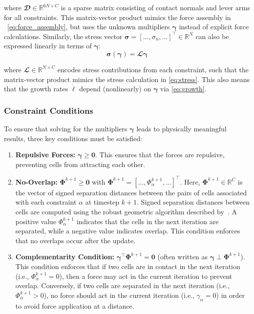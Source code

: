 \documentclass[conference]{IEEEtran}
\begin{document}
where $\mathbfcal{D} \in \mathbb{R}^{6N \times C}$ is a sparse matrix consisting of contact normals and lever arms for all constraints. This matrix-vector product mimics the force assembly in ~\autoref{eq:force_assembly}, but uses the unknown multipliers $\boldsymbol{\gamma}$ instead of explicit force calculations. Similarly, the stress vector $\boldsymbol{\sigma} = [\dots, \sigma_n, \dots]^\top \in \mathbb{R}^{N}$ can also be expressed linearly in terms of $\boldsymbol{\gamma}$:
\begin{equation} \label{eq:stress_as_function_of_multipliers}
    \boldsymbol{\sigma}(\boldsymbol{\gamma}) = \mathbfcal{L} \boldsymbol{\gamma}
\end{equation}

where $\mathbfcal{L} \in \mathbb{R}^{N \times C}$ encodes stress contributions from each constraint, such that the matrix-vector product mimics the stress calculation in \autoref{eq:stress}. This also means that the growth rates $\dot{\boldsymbol{\ell}}$ depend (nonlinearly) on $\boldsymbol{\gamma}$ via \autoref{eq:growth}.

\subsubsection{Constraint Conditions}

To ensure that solving for the multipliers $\boldsymbol{\gamma}$ leads to physically meaningful results, three key conditions must be satisfied:


\begin{enumerate}
    \item \textbf{Repulsive Forces:} $\boldsymbol{\gamma} \geq \mathbf{0}$. This ensures that the forces are repulsive, preventing cells from attracting each other.
    \item \textbf{No-Overlap:} $\mathbf{\Phi}^{k+1} \geq \mathbf{0}$ with $\mathbf{\Phi}^{k+1} = [\dots, \Phi_\alpha^{k+1}, \dots]^\top$. Here, $\mathbf{\Phi}^{k+1} \in \mathbb{R}^{C}$ is the vector of signed separation distances between the pairs of cells associated with each constraint $\alpha$ at timestep $k+1$. Signed separation distances between cells are computed using the robust geometric algorithm described by~\cite{Yan2019, GeometricTools}.
          A positive value $\Phi_\alpha^{k+1}$ indicates that the cells in the next iteration are separated, while a negative value indicates overlap. This condition enforces that no overlaps occur after the update.
    \item \textbf{Complementarity Condition:}  $\boldsymbol{\gamma}^\top \mathbf{\Phi}^{k+1} = \mathbf{0}$ (often written as $\boldsymbol{\gamma} \perp \mathbf{\Phi}^{k+1}$). This condition enforces that if two cells are in contact in the next iteration (i.e., $\Phi_\alpha^{k+1} = 0$), then a force may act in the current iteration to prevent overlap.
          Conversely, if two cells are separated in the next iteration (i.e., $\Phi_\alpha^{k+1} > 0$), no force should act in the current iteration (i.e., $\gamma_\alpha = 0$) in order to avoid force application at a distance.
\end{enumerate}
\end{document}
